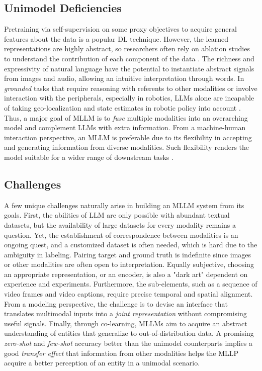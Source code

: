 \documentclass[11pt]{article}
\begin{document}
\subsection{Unimodel Deficiencies}
Pretraining via self-supervision on some proxy objectives to acquire general features about the data is a popular DL technique. However, the learned representations are highly abstract, so researchers often rely on ablation studies to understand the contribution of each component of the data \citep{DBLP:conf/cvpr/ZhaoJK20}. The richness and expressivity of natural language have the potential to instantiate abstract signals from images and audio, allowing an intuitive interpretation through words. In \textit{grounded} tasks that require reasoning with referents to other modalities or involve interaction with the peripherals, especially in robotics, LLMs alone are incapable of taking geo-localization and state estimates in robotic policy into account \citep{DBLP:conf/icml/DriessXSLCIWTVY23}. Thus, a major goal of MLLM is to \textit{fuse} multiple modalities into an overarching model and complement LLMs with extra information. From a machine-human interaction perspective, an MLLM is preferable due to its flexibility in accepting and generating information from diverse modalities. Such flexibility renders the model suitable for a wider range of downstream tasks \cite{gpt4, dalle3}.

\subsection{Challenges}
A few unique challenges naturally arise in building an MLLM system from its goals. First, the abilities of LLM are only possible with abundant textual datasets, but the availability of large datasets for every modality remains a question. Yet, the establishment of correspondence between modalities is an ongoing quest, and a customized dataset is often needed, which is hard due to the ambiguity in labeling. Pairing target and ground truth is indefinite since images or other modalities are often open to interpretation. Equally subjective, choosing an appropriate representation, or an encoder, is also a "dark art" dependent on experience and experiments. Furthermore, the sub-elements, such as a sequence of video frames and video captions, require precise temporal and spatial alignment. From a modeling perspective, the challenge is to devise an interface that translates multimodal inputs into a \textit{joint representation} without compromising useful signals. Finally, through co-learning, MLLMs aim to acquire an abstract understanding of entities that generalize to out-of-distribution data. A promising \textit{zero-shot} and \textit{few-shot} accuracy better than the unimodel counterparts implies a good \textit{transfer effect} that information from other modalities helps the MLLP acquire a better perception of an entity in a unimodal scenario.
\end{document}
